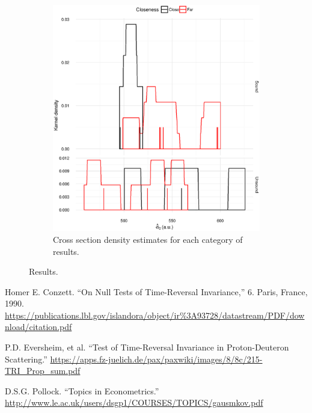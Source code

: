 \documentclass[reprint]{revtex4-1}
\newcommand{\scl}{.43}
\begin{document}
\begin{figure}
\begin{subfigure}{.5\textwidth}
\includegraphics[scale=\scl]{img/Cross-Section_dens.eps}
\caption{Cross section density estimates for each category of results.\label{fig:CS-dens}}
\end{subfigure}
\caption{Results.}
\end{figure}


\begin{thebibliography}{9}
Homer E. Conzett. ``On Null Tests of Time-Reversal Invariance,'' 6. Paris, France, 1990. \url{https://publications.lbl.gov/islandora/object/ir%3A93728/datastream/PDF/download/citation.pdf}

P.D. Eversheim, et al. ``Test of Time-Reversal Invariance in Proton-Deuteron Scattering.''
\url{https://apps.fz-juelich.de/pax/paxwiki/images/8/8c/215-TRI_Prop_sum.pdf}

D.S.G. Pollock. ``Topics in Econometrics.'' \url{http://www.le.ac.uk/users/dsgp1/COURSES/TOPICS/gausmkov.pdf}

\end{thebibliography}
\end{document}
